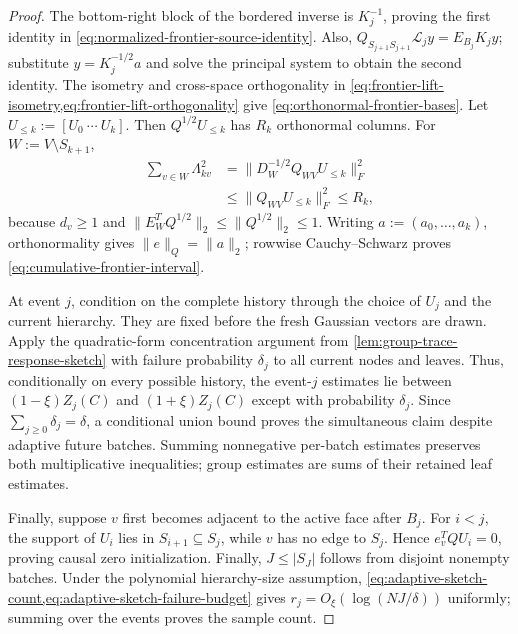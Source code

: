 \begin{proof}
The bottom-right block of the bordered inverse is $K_j^{-1}$, proving the
first identity in \cref{eq:normalized-frontier-source-identity}.  Also,
$Q_{S_{j+1}S_{j+1}}\mathcal L_jy=E_{B_j}K_jy$; substitute
$y=K_j^{-1/2}a$ and solve the principal system to obtain the second identity.
The isometry and cross-space orthogonality in
\cref{eq:frontier-lift-isometry,eq:frontier-lift-orthogonality} give
\cref{eq:orthonormal-frontier-bases}.  Let
$U_{\leq k}:=[U_0\ \cdots\ U_k]$.  Then
$Q^{1/2}U_{\leq k}$ has $R_k$ orthonormal columns.  For
$W:=V\setminus S_{k+1}$,
\begin{align*}
 \sum_{v\in W}\Lambda_{kv}^2
 &=\|D_W^{-1/2}Q_{WV}U_{\leq k}\|_F^2\\
 &\leq\|Q_{WV}U_{\leq k}\|_F^2
 \leq R_k,
\end{align*}
because $d_v\geq1$ and
$\|E_W^TQ^{1/2}\|_2\leq\|Q^{1/2}\|_2\leq1$.  Writing
$a:=(a_0,\ldots,a_k)$, orthonormality gives
$\|e\|_Q=\|a\|_2$; rowwise Cauchy--Schwarz proves
\cref{eq:cumulative-frontier-interval}.

At event $j$, condition on the complete history through the choice of
$U_j$ and the current hierarchy.  They are fixed before the fresh Gaussian
vectors are drawn.  Apply the quadratic-form concentration argument from
\cref{lem:group-trace-response-sketch} with failure probability $\delta_j$
to all current nodes and leaves.  Thus, conditionally on every possible
history, the event-$j$ estimates lie between
$(1-\xi)Z_j(C)$ and $(1+\xi)Z_j(C)$ except with probability $\delta_j$.
Since $\sum_{j\geq0}\delta_j=\delta$, a conditional union bound proves the
simultaneous claim despite adaptive future batches.  Summing nonnegative
per-batch estimates preserves both multiplicative inequalities; group
estimates are sums of their retained leaf estimates.

Finally, suppose $v$ first becomes adjacent to the active face after $B_j$.
For $i<j$, the support of $U_i$ lies in
$S_{i+1}\subseteq S_j$, while $v$ has no edge to $S_j$.  Hence
$e_v^TQU_i=0$, proving causal zero initialization.
Finally, $J\leq|S_J|$ follows from disjoint nonempty batches.  Under the
polynomial hierarchy-size assumption,
\cref{eq:adaptive-sketch-count,eq:adaptive-sketch-failure-budget} gives
$r_j=O_\xi(\log(NJ/\delta))$ uniformly; summing over the events proves the
sample count.
\end{proof}

